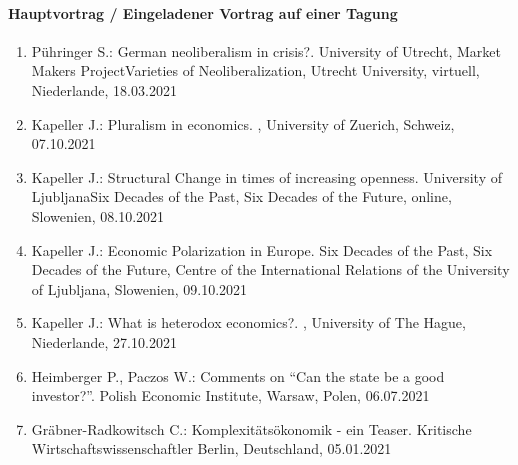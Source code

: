 \paragraph{Hauptvortrag / Eingeladener Vortrag auf einer Tagung}
\begin{enumerate}
	\item Pühringer S.: German neoliberalism in crisis?. University of Utrecht, Market Makers ProjectVarieties of Neoliberalization, Utrecht University, virtuell, Niederlande, 18.03.2021
	\item Kapeller J.: Pluralism in economics. , University of Zuerich, Schweiz, 07.10.2021
	\item Kapeller J.: Structural Change in times of increasing openness. University of LjubljanaSix Decades of the Past, Six Decades of the Future, online, Slowenien, 08.10.2021
	\item Kapeller J.: Economic Polarization in Europe. Six Decades of the Past, Six Decades of the Future, Centre of the International Relations of the University of Ljubljana, Slowenien, 09.10.2021
	\item Kapeller J.: What is heterodox economics?. , University of The Hague, Niederlande, 27.10.2021
	\item Heimberger P., Paczos W.: Comments on “Can the state be a good investor?”. Polish Economic Institute, Warsaw, Polen, 06.07.2021
	\item Gräbner-Radkowitsch C.: Komplexitätsökonomik - ein Teaser. Kritische Wirtschaftswissenschaftler Berlin, Deutschland, 05.01.2021
\end{enumerate}
